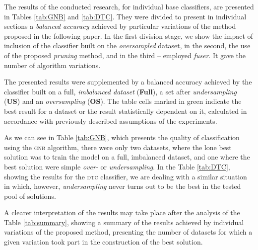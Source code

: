 \documentclass[pmlr]{jmlr}
\begin{document}
The results of the conducted research, for individual base classifiers, are presented in Tables \ref{tab:GNB} and \ref{tab:DTC}. They were divided to present in individual sections a \emph{balanced accuracy} achieved by particular variations of the method proposed in the following paper. In the first division stage, we show the impact of inclusion of the classifier built on the \emph{oversampled} dataset, in the second, the use of the proposed \emph{pruning} method, and in the third -- employed \emph{fuser}. It gave the number of  algorithm variations.

The presented results were supplemented by a balanced accuracy achieved by the classifier built on a full, \emph{imbalanced dataset} (\textbf{Full}), a set after \emph{undersampling} (\textbf{US}) and an \emph{oversampling} (\textbf{OS}). The table cells marked in green indicate the best result for a dataset or the result statistically dependent on it, calculated in accordance with previously described assumptions of the experiments.

\begin{table}
\end{table}

\begin{table}
\end{table}

As we can see in Table \ref{tab:GNB}, which presents the quality of classification using the \textsc{gnb} algorithm, there were only two datasets, where the lone best solution was to train the model on a full, imbalanced dataset, and one where the best solution were simple \emph{over-} or \emph{undersampling}. In the Table \ref{tab:DTC}, showing the results for the \textsc{dtc} classifier, we are dealing with a similar situation in which, however, \emph{undersampling} never turns out to be the best in the tested pool of solutions.

A clearer interpretation of the results may take place after the analysis of the Table \ref{tab:summary}, showing a summary of the results achieved by individual variations of the proposed method, presenting the number of datasets for which a given variation took part in the construction of the best solution.
\end{document}
